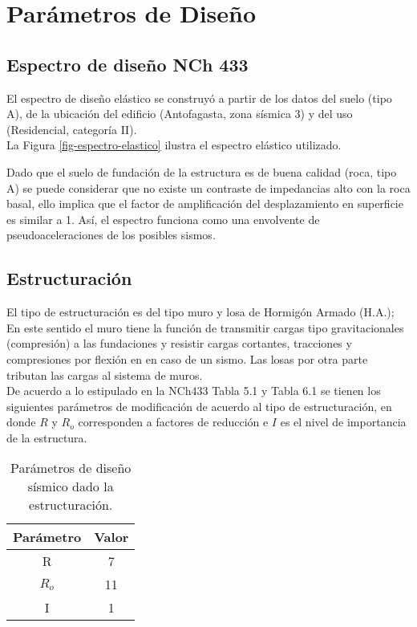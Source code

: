 \newpage

\section{Parámetros de Diseño}

\subsection{Espectro de diseño NCh 433}

El espectro de diseño elástico se construyó a partir de los datos del suelo (tipo A), de la ubicación del edificio (Antofagasta, zona sísmica 3) y del uso (Residencial, categoría II). \\

La Figura \ref{fig-espectro-elastico} ilustra el espectro elástico utilizado.


Dado que el suelo de fundación de la estructura es de buena calidad (roca, tipo A) se puede considerar que no existe un contraste de impedancias alto con la roca basal, ello implica que el factor de amplificación del desplazamiento en superficie es similar a 1. Así, el espectro funciona como una envolvente de pseudoaceleraciones de los posibles sismos.

\subsection{Estructuración}

El tipo de estructuración es del tipo muro y losa de Hormigón Armado (H.A.); En este sentido el muro tiene la función de transmitir cargas tipo gravitacionales (compresión) a las fundaciones y resistir cargas cortantes, tracciones y compresiones por flexión en en caso de un sismo. Las losas por otra parte tributan las cargas al sistema de muros. \\

De acuerdo a lo estipulado en la NCh433 Tabla 5.1 y Tabla 6.1 se tienen los siguientes parámetros de modificación de acuerdo al tipo de estructuración, en donde $R$ y $R_o$ corresponden a factores de reducción e $I$ es el nivel de importancia de la estructura.

\begin{table}[H]
  \centering
  \caption{Parámetros de diseño sísmico dado la estructuración.}
    \begin{tabular}{|c|c|}
    \hline
    \textbf{Parámetro} & \textbf{Valor} \bigstrut\\
    \hline
    R     & 7 \bigstrut\\
    \hline
    $R_o$ & 11 \bigstrut\\
    \hline
    I     & 1 \bigstrut\\
    \hline
    \end{tabular}%
\end{table}%

